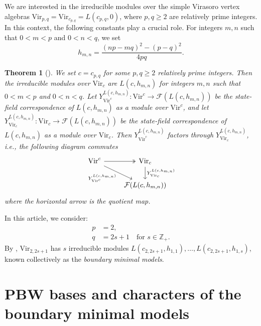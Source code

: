 \documentclass[a4paper, 12pt, reqno]{amsart}
\newtheorem{theorem}{Theorem}[section]
\theoremstyle{remark}
\newcommand{\Vir}{{\mathrm{Vir}}}
\begin{document}
We are interested in the irreducible modules over the simple Virasoro vertex algebras $\Vir_{p, q} = \Vir_{c_{p, q}} = L(c_{p, q}, 0)$, where $p, q \ge 2$ are relatively prime integers.
In this context, the following constants play a crucial role.
For integers $m, n$ such that $0 < m < p$ and $0 < n < q$, we set
\begin{equation*}
  h_{m, n} = \frac{(np - mq)^2 - (p - q)^2}{4pq}.
\end{equation*}

\begin{theorem}[{\cite{wang_rationality_1993}}]
  \label{thr:5}
  We set $c = c_{p, q}$ for some $p, q \ge 2$ relatively prime integers.
  Then the irreducible modules over $\Vir_c$ are $L(c, h_{m, n})$ for integers $m, n$ such that $0 < m < p$ and $0 < n < q$.
  Let $Y^{L(c, h_{m, n})}_{\Vir^c}: \Vir^c \to \mathcal{F}(L(c, h_{m, n}))$ be the state-field correspondence of $L(c, h_{m, n})$ as a module over $\Vir^c$, and let $Y^{L(c, h_{m, n})}_{\Vir_c}: \Vir_c \to \mathcal{F}(L(c, h_{m, n}))$ be the state-field correspondence of $L(c, h_{m, n})$ as a module over $\Vir_c$.
  Then $Y^{L(c, h_{m, n})}_{\Vir^c}$ factors through $Y^{L(c, h_{m, n})}_{\Vir_c}$, i.e., the following diagram commutes
  \begin{equation*}
    \begin{tikzcd}
      \Vir^c \arrow[r, two heads] \arrow[rd, "{Y^{L(c, h_{m, n})}_{\Vir^c}}"'] & {\Vir_c} \arrow[d, "{Y^{L(c, h_{m, n})}_{\Vir_c}}"] \\
      & {\mathcal{F}(L(c, h_{m, n}))}
    \end{tikzcd}
  \end{equation*}
  where the horizontal arrow is the quotient map.
\end{theorem}

In this article, we consider:
\begin{align*}
  p &= 2, \\
  q &= 2s + 1 \quad \text{for $s \in \mathbb{Z}_+$}.
\end{align*}
By , $\Vir_{2, 2s + 1}$ has $s$ irreducible modules $L(c_{2, 2s + 1}, h_{1, 1}), \dots, L(c_{2, 2s + 1}, h_{1, s})$, known collectively as the \emph{boundary minimal models}.

\section{PBW bases and characters of the boundary minimal models}
\label{sec:pbw-bases-characters}
\end{document}
